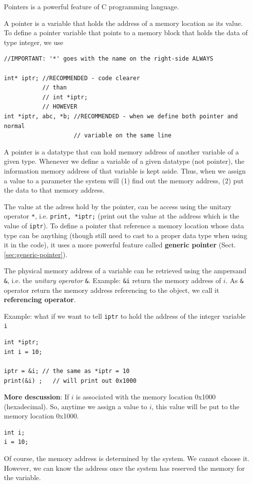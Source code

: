 Pointers is a powerful feature of C programming language. 

A pointer is a variable that holds the address of a memory location as its
value.
To define a pointer variable that points to a memory block that holds the data
of type integer, we use
\begin{lstlisting}
//IMPORTANT: '*' goes with the name on the right-side ALWAYS

int* iptr; //RECOMMENDED - code clearer
           // than 
           // int *iptr; 
           // HOWEVER 
int *iptr, abc, *b; //RECOMMENDED - when we define both pointer and normal
                    // variable on the same line
\end{lstlisting}

A pointer is a datatype that can hold memory address of another variable of a
given type.
Whenever we define a variable of a given datatype (not pointer), the information
memory address of that variable is kept aside. Thus, when we assign a value to a
parameter the system will (1) find out the memory address, (2) put the data to
that memory address.


The value at the adress hold by the pointer, can be access using the unitary
operator \verb!*!, i.e. \verb!print, *iptr;! (print out the value at the
address which is the value of \verb!iptr!). To define a pointer that reference a
memory location whose data type can be anything (though still need to cast to a
proper data type when using it in the code), it uses a more powerful
feature called {\bf generic pointer} (Sect.\ref{sec:generic-pointer}).


The physical memory address of a variable can be retrieved using the ampersand
\verb!&!, i.e. the {\it unitary operator} \verb!&!. Example: \verb!&i! return
the memory address of $i$. As \verb!&! operator return the memory address
referencing to the object, we call it {\bf referencing operator}.

Example: what if we want to tell \verb!iptr! to hold the address of the integer
variable \verb!i!
\begin{lstlisting}
int *iptr;
int i = 10;

iptr = &i; // the same as *iptr = 10
print(&i) ;   // will print out 0x1000
\end{lstlisting}


{\bf More descussion}: If $i$ is associated with the memory location
0x1000 (hexadecimal). So, anytime we assign a value to $i$, this value
will be put to the memory location 0x1000.
\begin{lstlisting}
int i;
i = 10;
\end{lstlisting}
Of course, the memory address is determined by the system. We cannot
choose it. However, we can know the address once the system has
reserved the memory for the variable.


